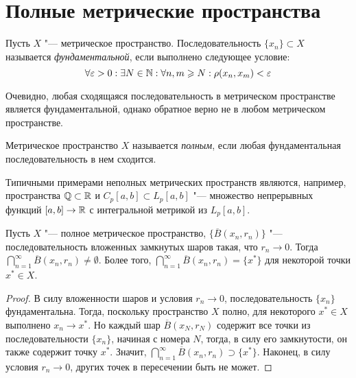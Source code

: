\section{Полные метрические пространства}

\begin{definition}
    Пусть $X$ "--- метрическое пространство. Последовательность $\{x_n\} \subset X$ называется \textit{фундаментальной}, если выполнено следующее условие:
    \[\forall \varepsilon > 0: \exists N \in \mathbb{N}: \forall n, m \geqslant N: \rho(x_n, x_m) < \varepsilon\]
\end{definition}

\begin{note}
    Очевидно, любая сходящаяся последовательность в метрическом пространстве является фундаментальной, однако обратное верно не в любом метрическом пространстве.
\end{note}

\begin{definition}
    Метрическое пространство $X$ называется \textit{полным}, если любая фундаментальная последовательность в нем сходится.
\end{definition}

\begin{note}
    Типичными примерами неполных метрических пространств являются, например, пространства $\mathbb{Q} \subset \mathbb{R}$ и $C_p[a, b] \subset L_p[a, b]$ "--- множество непрерывных функций $[a, b] \to \mathbb{R}$ с интегральной метрикой из $L_p[a, b]$.
\end{note}

\begin{theorem}\label{thm2.1}
    Пусть $X$ "--- полное метрическое пространство, $\big\{\overline B(x_n, r_n)\big\}$ "--- последовательность вложенных замкнутых шаров такая, что $r_n \to 0$. Тогда $\bigcap_{n = 1}^\infty \overline B(x_n, r_n) \ne \emptyset$. Более того, $\bigcap_{n = 1}^\infty \overline B(x_n, r_n) = \{x^*\}$ для некоторой точки $x^* \in X$.
\end{theorem}

\begin{proof}
    В силу вложенности шаров и условия $r_n \to 0$, последовательность $\{x_n\}$ фундаментальна. Тогда, поскольку пространство $X$ полно, для некоторого $x^* \in X$ выполнено $x_n \to x^*$. Но каждый шар $\overline B(x_N, r_N)$ содержит все точки из последовательности $\{x_n\}$, начиная с номера $N$, тогда, в силу его замкнутости, он также содержит точку $x^*$. Значит, $\bigcap_{n = 1}^\infty \overline B(x_n, r_n) \supset \{x^*\}$. Наконец, в силу условия $r_n \to 0$, других точек в пересечении быть не может.
\end{proof}


